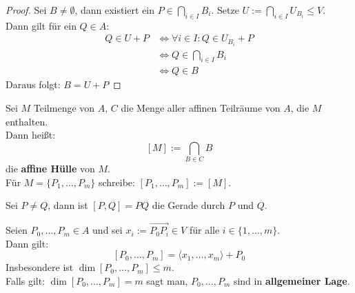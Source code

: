 \documentclass[parskip,a4paper,twoside,DIV15,BCOR12mm]{scrbook}
\begin{document}
\begin{proof}
Sei $B\ne\emptyset$, dann existiert ein $P\in\bigcap_{i\in I}B_i$.
Setze $U:=\bigcap_{i\in I}U_{B_i} \le V$.\\
Dann gilt für ein $Q\in A$:\\
\begin{align*}
Q\in U+P &\iff \forall i\in I: Q\in U_{B_i}+P\\
&\iff Q\in\bigcap_{i\in I}B_i\\
&\iff Q\in B
\end{align*}
Daraus folgt: $B=U+P$
\end{proof}

\begin{definition}
Sei $M$ Teilmenge von $A$, $C$ die Menge aller affinen Teilräume von $A$, die $M$ enthalten.\\
Dann heißt:
\[[M]:=\bigcap_{B\in C}B\]
die \textbf{affine Hülle} von $M$.\\
Für $M=\{P_1,\ldots,P_m\}$ schreibe: $[P_1,\ldots,P_m]:=[M]$.
\end{definition}

\begin{example}
Sei $P\ne Q$, dann ist $[P,Q]=PQ$ die Gerade durch $P$ und $Q$.
\end{example}

\begin{lemma}
Seien $P_0,\ldots,P_m\in A$ und sei $x_i:=\overrightarrow{P_0P_i}\in V$ für alle $i\in\{1,\ldots,m\}$.\\
Dann gilt:
\[[P_0,\ldots ,P_m]=\langle x_1,\ldots ,x_m \rangle +P_0\]
Insbesondere ist $\dim{[P_0,\ldots,P_m]}\le m$.\\
Falls gilt: $\dim{[P_0,\ldots,P_m]}=m$ sagt man, $P_0,\ldots,P_m$ sind in \textbf{allgemeiner Lage}.
\end{lemma}
\end{document}
